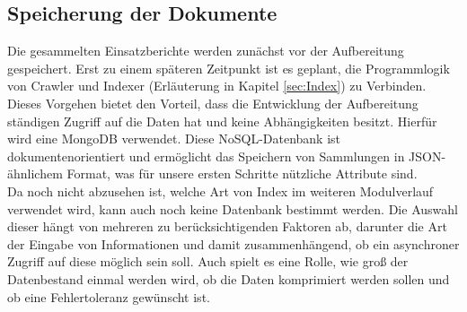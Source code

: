 \subsection{Speicherung der Dokumente}
\label{sec:Speicherung}
Die gesammelten Einsatzberichte werden zunächst vor der Aufbereitung gespeichert. Erst zu einem späteren Zeitpunkt ist es geplant, die Programmlogik von Crawler und Indexer (Erläuterung in Kapitel \ref{sec:Index}) zu Verbinden. Dieses Vorgehen bietet den Vorteil, dass die Entwicklung der Aufbereitung ständigen Zugriff auf die Daten hat und keine Abhängigkeiten besitzt. Hierfür wird eine MongoDB verwendet. Diese NoSQL-Datenbank ist dokumentenorientiert und ermöglicht das Speichern von Sammlungen in JSON-ähnlichem Format, was für unsere ersten Schritte nützliche Attribute sind. \cite{wikimongodb}\\
Da noch nicht abzusehen ist, welche Art von Index im weiteren Modulverlauf verwendet wird, kann auch noch keine Datenbank bestimmt werden. Die Auswahl dieser hängt von mehreren zu berücksichtigenden Faktoren ab, darunter die Art der Eingabe von Informationen und damit zusammenhängend, ob ein asynchroner Zugriff auf diese möglich sein soll. Auch spielt es eine Rolle, wie groß der Datenbestand einmal werden wird, ob die Daten komprimiert werden sollen und ob eine Fehlertoleranz gewünscht ist. \cite{wikiseindexing}

